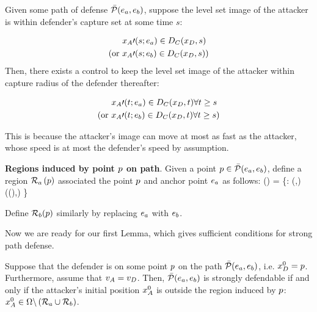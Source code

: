 \begin{rem}
Given some path of defense $\bar{\mathcal{P}}(e_a,e_b)$, suppose the level set image of the attacker is within defender's capture set at some time $s$: 

\begin{equation*}
\begin{aligned}
&x_A\prime(s;e_a) \in D_C(x_D, s) \\
\text{(or } & x_A\prime(s;e_b) \in D_C(x_D, s) \text{)}
\end{aligned}
\end{equation*}
Then, there exists a control to keep the level set image of the attacker within capture radius of the defender thereafter: 

\begin{equation*}
\begin{aligned}
&x_A\prime(t;e_a) \in D_C(x_D, t) \forall t\geq s\\
\text{(or } & x_A\prime(t;e_b) \in D_C(x_D, t) \forall t\geq s\text{)}
\end{aligned}
\end{equation*}

This is because the attacker's image can move at most as fast as the attacker, whose speed is at most the defender's speed by assumption.
\end{rem}

\begin{defn} %
\label{def:d_win_region}
\textbf{Regions induced by point $p$ on path}. Given a point $p\in\bar{\mathcal{P}}(e_a,e_b)$, define a region $\mathcal{R}_a\left(p\right)$ associated the point $p$ and anchor point $e_a$ as follows:
\bq
\rpa\left(\ppath\right) = \left\{\x: \dist(\x,\apa) \leq \dist(\Dc(\ppath),\apa) \right\}
\eq

Define $\mathcal{R}_b(p)$ similarly by replacing $e_a$ with $e_b$.
\end{defn}

Now we are ready for our first Lemma, which gives sufficient conditions for strong path defense.
\begin{lem}
\label{lem:d_winning_region}
Suppose that the defender is on some point $p$ on the path $\bar{\mathcal{P}}(e_a,e_b)$, i.e. $x_D^0 = p$. Furthermore, assume that $v_A=v_D$. Then, $\bar{\mathcal{P}}(e_a,e_b)$ is strongly defendable if and only if the attacker's initial position $x_A^0$ is outside the region induced by $p$: $x_A^0\in\Omega\backslash\left(\mathcal{R}_a \cup \mathcal{R}_b\right)$.
\end{lem}

